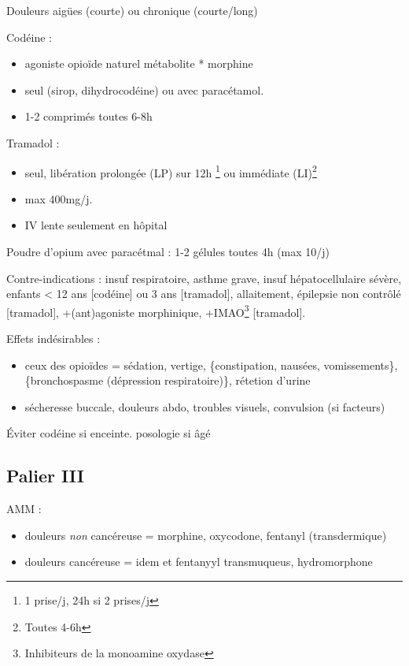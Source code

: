 \documentclass[11pt]{article}
\begin{document}

Douleurs aigües (courte) ou chronique (courte/long)

Codéine : 
\begin{itemize}
\item agoniste opioïde naturel \thus métabolite * morphine
\item seul (sirop, dihydrocodéine) ou avec paracétamol.
\item 1-2 comprimés toutes 6-8h
\end{itemize}

Tramadol : 
\begin{itemize}
\item seul, libération prolongée (LP) sur 12h \footnote{1 prise/j, 24h si 2 prises/j} ou immédiate (LI)\footnote{Toutes 4-6h}
\item max 400mg/j.
\item IV lente seulement en hôpital
\end{itemize}

Poudre d'opium avec paracétmal : 1-2 gélules toutes 4h (max 10/j)

Contre-indications : insuf respiratoire, asthme grave, insuf hépatocellulaire
sévère, enfants < 12 ans [codéine] ou 3 ans [tramadol], allaitement, épilepsie
non contrôlé [tramadol], +(ant)agoniste morphinique, +IMAO\footnote{Inhibiteurs de la monoamine oxydase} [tramadol].

Effets indésirables :
\begin{itemize}
\item ceux des opioïdes = sédation, vertige, \{constipation, nausées, vomissements\},
\{bronchospasme (dépression respiratoire)\}, rétetion d'urine
\item sécheresse buccale, douleurs abdo, troubles visuels, convulsion (si facteurs)
\end{itemize}

Éviter codéine si enceinte. \dec posologie si âgé

\subsection{Palier III}
\label{sec:orgdfdaba8}
AMM : 
\begin{itemize}
\item douleurs \emph{non} cancéreuse = morphine, oxycodone, fentanyl (transdermique)
\item douleurs cancéreuse = idem et fentanyyl transmuqueus, hydromorphone
\end{itemize}
\end{document}
